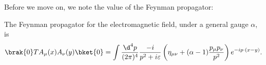 \documentclass[a4paper]{article}
\begin{document}
%
%

Before we move on, we note the value of the Feynman propagator:

\begin{thm}
  The Feynman propagator for the electromagnetic field, under a general gauge $\alpha$, is
  \[
    \brak{0} TA_\mu(x) A_\nu(y) \bket{0} = \int \frac{\d^4 p}{(2\pi)^4} \frac{-i}{p^2 + i\varepsilon} \left(\eta_{\mu\nu} + (\alpha - 1) \frac{p_\mu p_\nu}{p^2}\right) e^{-ip\cdot(x - y)}.
  \]
\end{thm}
\end{document}
